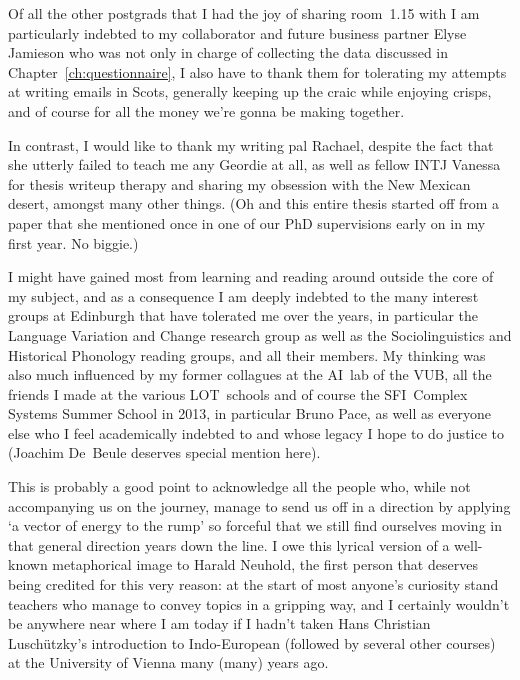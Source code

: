 \documentclass[oneside]{book}
\begin{document}
Of all the other postgrads that I had the joy of sharing room~1.15 with I am particularly indebted to my collaborator and future business partner Elyse Jamieson who was not only in charge of collecting the data discussed in Chapter~\ref{ch:questionnaire}, I also have to thank them for tolerating my attempts at writing emails in Scots, generally keeping up the craic while enjoying crisps, and of course for all the money we're gonna be making together.

In contrast, I would like to thank my writing pal Rachael, despite the fact that she utterly failed to teach me any Geordie at all, as well as fellow INTJ Vanessa for thesis writeup therapy and sharing my obsession with the New Mexican desert, amongst many other things. (Oh and this entire thesis started off from a paper that she mentioned once in one of our PhD supervisions early on in my first year. No biggie.)

I might have gained most from learning and reading around outside the core of my subject, and as a consequence I am deeply indebted to the many interest groups at Edinburgh that have tolerated me over the years, in particular the Language Variation and Change research group as well as the Sociolinguistics and Historical Phonology reading groups, and all their members. My thinking was also much influenced by my former collagues at the AI~lab of the VUB, all the friends I made at the various LOT~schools and of course the SFI~Complex Systems Summer School in 2013, in particular Bruno Pace, as well as everyone else who I feel academically indebted to and whose legacy I hope to do justice to (Joachim De~Beule deserves special mention here).

This is probably a good point to acknowledge all the people who, while not accompanying us on the journey, manage to send us off in a direction by applying `a vector of energy to the rump' so forceful that we still find ourselves moving in that general direction years down the line. I owe this lyrical version of a well-known metaphorical image to Harald Neuhold, the first person that deserves being credited for this very reason: at the start of most anyone's curiosity stand teachers who manage to convey topics in a gripping way, and I certainly wouldn't be anywhere near where I am today if I hadn't taken Hans Christian Luschützky's introduction to Indo-European (followed by several other courses) at the University of Vienna many (many) years ago.
\end{document}
